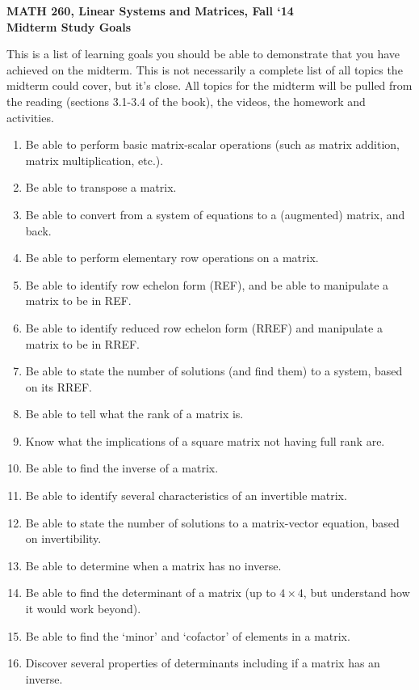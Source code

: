 \documentclass{article}
\begin{document}
\begin{flushleft}
	\bfseries{MATH 260, Linear Systems and Matrices, Fall `14}\\
	\bfseries{Midterm Study Goals}\\
\end{flushleft}
\begin{flushleft}
This is a list of learning goals you should be able to demonstrate that you have achieved on the midterm.  This is not necessarily a complete list of all topics the midterm could cover, but it's close.  All topics for the midterm will be pulled from the reading (sections 3.1-3.4 of the book), the videos, the homework and activities.

\vspace{0.2in}

\begin{enumerate}
\item Be able to perform basic matrix-scalar operations (such as matrix addition, matrix multiplication, etc.).
\item Be able to transpose a matrix.
\item Be able to convert from a system of equations to a (augmented) matrix, and back.
\item Be able to perform elementary row operations on a matrix.
\item Be able to identify row echelon form (REF), and be able to manipulate a matrix to be in REF.
\item Be able to identify reduced row echelon form (RREF) and manipulate a matrix to be in RREF.
\item Be able to state the number of solutions (and find them) to a system, based on its RREF.
\item Be able to tell what the rank of a matrix is.
\item Know what the implications of a square matrix not having full rank are.
\item Be able to find the inverse of a matrix.
\item Be able to identify several characteristics of an invertible matrix. 
\item Be able to state the number of solutions to a matrix-vector equation, based on invertibility.
\item Be able to determine when a matrix has no inverse.
\item Be able to find the determinant of a matrix (up to $4 \times 4$, but understand how it would work beyond).
\item Be able to find the `minor' and `cofactor' of elements in a matrix. 
\item Discover several properties of determinants including if a matrix has an inverse.
\end{enumerate}

\end{flushleft}
\end{document}
